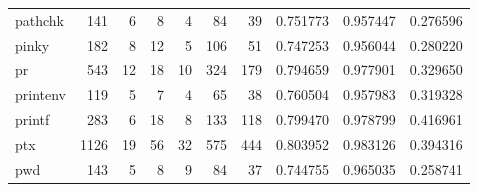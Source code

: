 \begin{tabular}{lrrrrrrrrr}
pathchk   &                    141 &                                  6 &                                 8 &                                4 &                                84 &                              39 &                                0.751773 &                               0.957447 &                             0.276596 \\
pinky     &                    182 &                                  8 &                                12 &                                5 &                               106 &                              51 &                                0.747253 &                               0.956044 &                             0.280220 \\
pr        &                    543 &                                 12 &                                18 &                               10 &                               324 &                             179 &                                0.794659 &                               0.977901 &                             0.329650 \\
printenv  &                    119 &                                  5 &                                 7 &                                4 &                                65 &                              38 &                                0.760504 &                               0.957983 &                             0.319328 \\
printf    &                    283 &                                  6 &                                18 &                                8 &                               133 &                             118 &                                0.799470 &                               0.978799 &                             0.416961 \\
ptx       &                   1126 &                                 19 &                                56 &                               32 &                               575 &                             444 &                                0.803952 &                               0.983126 &                             0.394316 \\
pwd       &                    143 &                                  5 &                                 8 &                                9 &                                84 &                              37 &                                0.744755 &                               0.965035 &                             0.258741 \\

\end{tabular}
